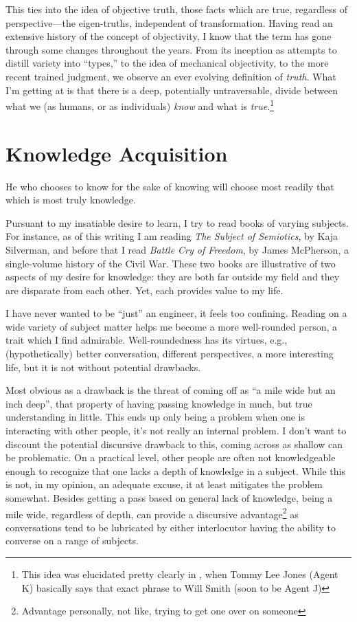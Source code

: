 \documentclass[../butidigress.tex]{subfiles}
\begin{document}
This ties into the idea of objective truth, those facts which are true, regardless of perspective---the eigen-truths, independent of transformation.
Having read an extensive history of the concept of objectivity, I know that the term has gone through some changes throughout the years\parencite{objectivity}.
From its inception as attempts to distill variety into ``types,'' to the idea of mechanical objectivity, to the more recent trained judgment, we observe an ever evolving definition of \emph{truth}.
What I'm getting at is that there is a deep, potentially untraversable, divide between what we (as humans, or as individuals) \emph{know} and what is \emph{true}.\footnote{This idea was elucidated pretty clearly in , when Tommy Lee Jones (Agent K) basically says that exact phrase to Will Smith (soon to be Agent J)}

\section{Knowledge Acquisition}
\epigraph{He who chooses to know for the sake of knowing will choose most readily that which is most truly knowledge.}{}

Pursuant to my insatiable desire to learn, I try to read books of varying subjects.
For instance, as of this writing I am reading \textit{The Subject of Semiotics}, by Kaja Silverman, and before that I read \textit{Battle Cry of Freedom}, by James McPherson, a single-volume history of the Civil War.
These two books are illustrative of two aspects of my desire for knowledge: they are both far outside my field and they are disparate from each other.
Yet, each provides value to my life.

I have never wanted to be ``just'' an engineer, it feels too confining.
Reading on a wide variety of subject matter helps me become a more well-rounded person, a trait which I find admirable.
Well-roundedness has its virtues, e.g., (hypothetically) better conversation, different perspectives, a more interesting life, but it is not without potential drawbacks.

Most obvious as a drawback is the threat of coming off as ``a mile wide but an inch deep'', that property of having passing knowledge in much, but true understanding in little.
This ends up only being a problem when one is interacting with other people, it's not really an internal problem.
I don't want to discount the potential discursive drawback to this, coming across as shallow can be problematic.
On a practical level, other people are often not knowledgeable enough to recognize that one lacks a depth of knowledge in a subject.
While this is not, in my opinion, an adequate excuse, it at least mitigates the problem somewhat.
Besides getting a pass based on general lack of knowledge, being a mile wide, regardless of depth, can provide a discursive advantage\footnote{Advantage personally, not like, trying to get one over on someone} as conversations tend to be lubricated by either interlocutor having the ability to converse on a range of subjects.
\end{document}
